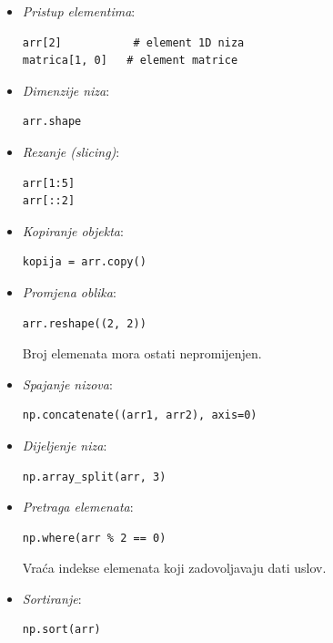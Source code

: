 \begin{itemize}
	
	\item \textit{Pristup elementima}: 
	
	\begin{verbatim}
arr[2]           # element 1D niza
matrica[1, 0]   # element matrice
\end{verbatim}
	
	\item \textit{Dimenzije niza}:
	
	\begin{verbatim}
arr.shape
\end{verbatim}
	
	
	\item \textit{Rezanje (slicing)}:
	
	\begin{verbatim}
arr[1:5]
arr[::2]
\end{verbatim}
	
	\item \textit{Kopiranje objekta}:
	\begin{verbatim}
kopija = arr.copy()
\end{verbatim}
	
	\item \textit{Promjena oblika}:
	\begin{verbatim}
arr.reshape((2, 2))
\end{verbatim}
	
	Broj elemenata mora ostati nepromijenjen.
	
	\item \textit{Spajanje nizova}:
	\begin{verbatim}
np.concatenate((arr1, arr2), axis=0)
\end{verbatim}
	
	\item \textit{Dijeljenje niza}:
	\begin{verbatim}
np.array_split(arr, 3)
\end{verbatim}
	
	\item \textit{Pretraga elemenata}:
	\begin{verbatim}
np.where(arr % 2 == 0)
\end{verbatim}
	
	Vraća indekse elemenata koji zadovoljavaju dati uslov.
	
	\item \textit{Sortiranje}:
	\begin{verbatim}
np.sort(arr)
\end{verbatim}
	

\end{itemize}
